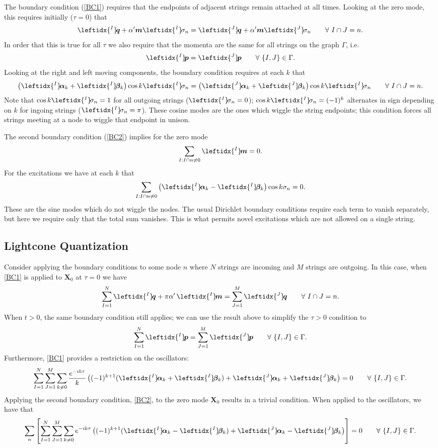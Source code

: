 \documentclass{revtex4}
\newcommand{\be}{\begin{eqnarray}}
\newcommand{\ee}{\end{eqnarray}}
\def\X{\bm{X}}
\def\p{\bm{p}}
\def\q{\bm{q}}
\def\a{\bm{a}}
\def\m{\bm{m}}
\def\b{\bm{b}}
\def\lI{\leftidx{^I} \! }
\def\lJ{\leftidx{^J} \! }
\def\a{\bm{\alpha}}
\def\b{\bm{\beta}}
\begin{document}
The boundary condition (\ref{BC1}) requires that the endpoints of adjacent strings remain attached at all times. Looking at the zero mode, this requires initially ($\tau = 0$) that
\be
\lI \q + \alpha' \m \lI \sigma_n = \lJ \q + \alpha' \m \lJ \sigma_n \qquad \forall \ I \cap J = n .
\ee
In order that this is true for all $\tau$ we also require that the momenta are the same for all strings on the graph $\Gamma$, i.e. 
\be
\lI \p = \lJ \p \qquad \forall \ \{I, J\} \in \Gamma.
\ee
Looking at the right and left moving components, the boundary condition requires at each $k$ that
\be
\left( \lI \a_k + \lI \b_k \right) \cos k \lI \sigma_n = \left( \lJ \a_k  + \lJ \b_k \right) \cos k \lI \sigma_n \qquad \forall \ I \cap J = n.
\ee
Note that $\cos k \lI \sigma_n = 1$ for all outgoing strings ($\lI \sigma_n = 0$); $\cos k \lI \sigma_n = (-1)^k$ alternates in sign depending on $k$ for ingoing strings ($\lI \sigma_n = \pi$).
These cosine modes are the ones which wiggle the string endpoints; this condition forces all strings meeting at a node to wiggle that endpoint in unison.

The second boundary condition (\ref{BC2}) implies for the zero mode
\be
\sum_{I : I \cap n \ne 0} \lI \m = 0 .
\ee
For the excitations we have at each $k$ that
\be
\sum_{I : I \cap n \ne 0} \left( \lI \a_k - \lI \b_k \right)  \cos k \sigma_n = 0. 
\ee
These are the sine modes which do not wiggle the nodes. The usual Dirichlet boundary conditions require each term to vanish separately, but here we require only that the total sum vanishes. This is what permits novel excitations which are not allowed on a single string.

\subsection{Lightcone Quantization}
Consider applying the boundary conditions to some node $n$ where $N$ strings are incoming and $M$ strings are outgoing. In this case, when \eqref{BC1} is applied to $\X_0$ at $\tau = 0$ we have
\be
\sum^N_{I = 1} \lI \q + \pi \alpha' \, \lI \m = \sum^M_{J = 1}  \lJ \q \qquad \forall \ I \cap J = n .
\ee
When $t > 0$, the same boundary condition still applies; we can use the result above to simplify the $\tau > 0$ condition to
\be
\sum^N_{I = 1} \lI \p = \sum^M_{J=1} \lJ \p \qquad \forall \ \{I,J\} \in \Gamma .
\ee
Furthermore, \eqref{BC1} provides a restriction on the oscillators:
\be
\sum^N_{I=1} \sum^M_{J=1} \sum_{k \neq 0} \frac{e^{-ik \tau}}{k} \left( (-1)^{k+1} ( \lI \a_k + \lI \b_k) + \lJ \a_k + \lJ \b_k \right) = 0 \qquad \forall \ \{I,J\} \in \Gamma .
\ee
Applying the second boundary condition, \eqref{BC2}, to the zero mode $\X_0$ results in a trivial condition. When applied to the oscillators, we have that
\be
\sum_n \left[ \sum_{I=1}^N \sum_{J=1}^M \sum_{k \neq 0} e^{-ik\tau} \left( (-1)^{k+1} (\lI \a_k - \lI \b_k) + \lJ \a_k - \lJ \b_k \right) \right] = 0 \qquad \forall \ \{I,J\} \in \Gamma.
\ee
\end{document}
